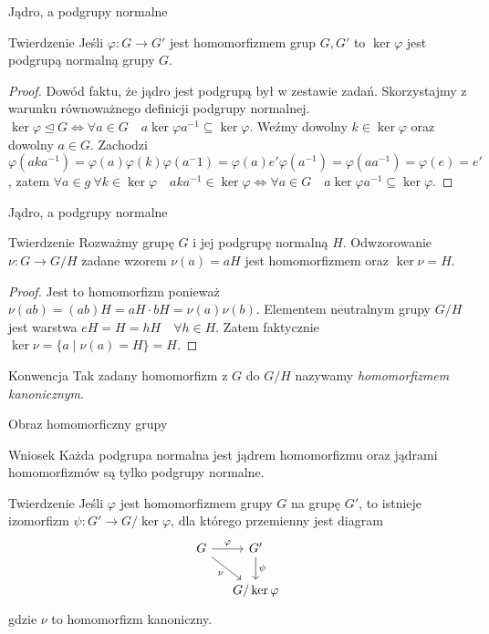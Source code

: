 \documentclass{beamer}
\let\phi\varphi
\begin{document}
\begin{frame}{Jądro, a podgrupy normalne}
    \begin{block}{Twierdzenie}
        Jeśli $\phi : G \rightarrow  G'$ jest homomorfizmem grup $G, G'$ to $\ker \phi$ jest podgrupą normalną grupy $G$.
    \end{block}
    \pause 
    \begin{proof}
        Dowód faktu, że jądro jest podgrupą był w zestawie zadań. Skorzystajmy z warunku równoważnego definicji podgrupy normalnej.
        $\ker \phi \trianglelefteq G \Leftrightarrow \forall a \in G \quad a \ker \phi a^{-1} \subseteq \ker \phi$. 
        Weźmy dowolny $k \in \ker \phi$ oraz dowolny $a \in G$. Zachodzi $\phi(aka^{-1}) = \phi(a) \phi(k) \phi(a^-1) = \phi(a) e' \phi(a^{-1}) = \phi(a a^{-1}) = \phi(e) = e'$, 
        zatem $\forall a \in g  \ \forall k \in \ker \phi \quad a k a^{-1} \in \ker \phi  \Leftrightarrow \forall a \in G \quad a \ker \phi a^{-1} \subseteq \ker \phi$.
    \end{proof}
\end{frame}

\begin{frame}{Jądro, a podgrupy normalne}
    \begin{block}{Twierdzenie}
        Rozważmy grupę $G$ i jej podgrupę normalną $H$. Odwzorowanie $\nu : G \rightarrow G/H$ zadane wzorem $\nu(a) = aH$
        jest homomorfizmem oraz $\ker \nu = H$.
    \end{block}
    \pause 
    \begin{proof}
        Jest to homomorfizm ponieważ $\nu(ab) = (ab)H = aH \cdot bH = \nu(a)\nu(b)$. Elementem neutralnym grupy $G/H$ jest warstwa $eH = H = hH  \quad \forall h \in H.$
        Zatem faktycznie $\ker \nu = \{ a \mid \nu(a) = H\} = H$. 
    \end{proof}    
    \pause 
    \begin{alertblock}{Konwencja}
        Tak zadany homomorfizm z $G$ do $G/H$ nazywamy \textit{homomorfizmem kanonicznym}.
    \end{alertblock}
\end{frame}

\begin{frame}{Obraz homomorficzny grupy}
    \begin{alertblock}{Wniosek}
        Każda podgrupa normalna jest jądrem homomorfizmu oraz jądrami homomorfizmów są tylko podgrupy normalne.
    \end{alertblock}
    \pause
    \begin{block}{Twierdzenie}
        Jeśli $\phi$ jest homomorfizmem grupy $G$ na grupę $G'$, to istnieje izomorfizm $\psi : G' \rightarrow G/\ker\phi$,
        dla którego przemienny jest diagram 
        $$
            \begin{tikzcd}[ampersand replacement=\&, column sep=small]
                G \arrow[r, "\phi"]  \arrow[rd, "\nu"'] \& G' \arrow[d, "\psi"] \\
                \& G / \ker \phi
            \end{tikzcd}
        $$   
        gdzie $\nu$ to homomorfizm kanoniczny.
    \end{block}
\end{frame}
\end{document}
